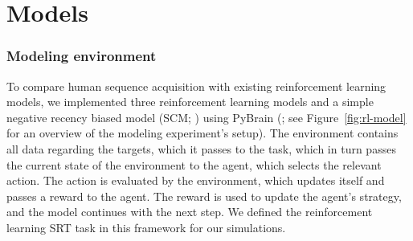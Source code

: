 \documentclass[man,floatsintext]{apa6}
\begin{document}

\section{Models}


\subsubsection{Modeling environment}

To compare human sequence acquisition with existing reinforcement learning models, we implemented three reinforcement learning models and a simple negative recency biased model (SCM; ) using PyBrain (; see Figure~\ref{fig:rl-model} for an overview of the modeling experiment's setup). The environment contains all data regarding the targets, which it passes to the task, which in turn passes the current state of the environment to the agent, which selects the relevant action. The action is evaluated by the environment, which updates itself and passes a reward to the agent. The reward is used to update the agent's strategy, and the model continues with the next step. We defined the reinforcement learning SRT task in this framework for our simulations.
\end{document}
